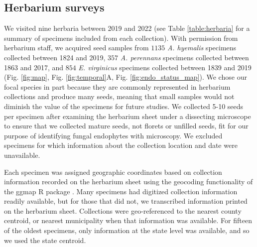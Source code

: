 \documentclass[11pt]{article}
\newcommand{\revise}[1]{{\color{black}{#1}}}
\begin{document}
		\subsection*{Herbarium surveys}
We visited nine herbaria between 2019 and 2022 (see Table \ref{table:herbaria} for a summary of specimens included from each collection). 
With permission from herbarium staff, we acquired seed samples from $1135$ \emph{A. hyemalis} specimens collected between 1824 and 2019, $357$ \emph{A. perennans} specimens collected between 1863 and 2017, and $854$ \emph{E. virginicus} specimens collected between 1839 and 2019 (Fig. \ref{fig:map}, Fig. \ref{fig:temporal}A, Fig. \ref{fig:endo_status_map}).
We chose our focal species in part because they are commonly represented in herbarium collections and produce many seeds, meaning that small samples would not diminish the value of the specimens for future studies. 
We collected 5-10 seeds per specimen after examining the herbarium sheet under a dissecting microscope to ensure that we collected mature seeds, not florets or unfilled seeds, fit for our purpose of identifying fungal endophytes with microscopy.
We excluded specimens for which information about the collection location and date were unavailable.

Each specimen was assigned geographic coordinates based on collection information recorded on the herbarium sheet using the geocoding functionality of the ggmap R package \citep{kahle2019package}.
Many specimens had digitized collection information readily available, but for those that did not, we transcribed information printed on the herbarium sheet. 
Collections were geo-referenced to the nearest county centroid, or nearest municipality when that information was available. 
For fifteen of the oldest specimens, only information at the state level was available, and so we used the state centroid.
\linelabel{R2C24-begin}\revise{The median pairwise distance between georeferenced coordinate points was 841 km.
The median longitudinal width of the bounding boxes generated to geocode municipality, county, or state centroids was 44.7 km. 
Among those specimens geo-referenced at the state level, the largest bounding box, spanning the state of Texas, was 1233 km wide.
The smallest bounding boxes were less than 1 km across for small municipalities (while this suggests high precision, we note that some specimens were collected in natural habitat nearby to small municipalities not encompassed by this bounding boxes).}
\end{document}
